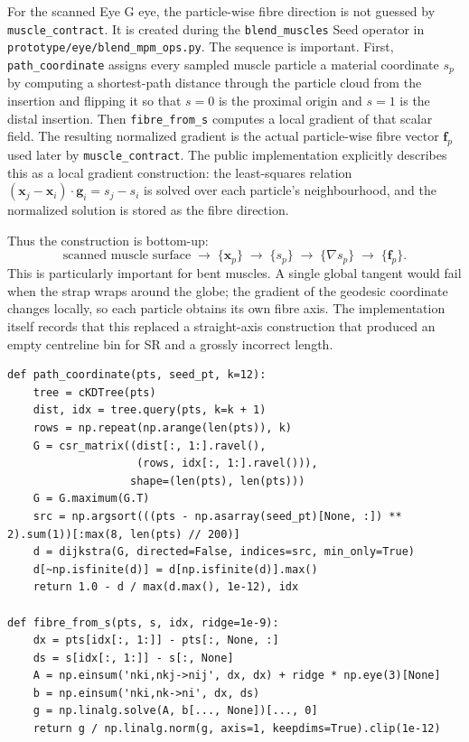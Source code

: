 \documentclass[11pt]{article}
\newcommand{\vect}[1]{\bm{#1}}
\begin{document}
For the scanned Eye G eye, the particle-wise fibre direction is not guessed by
\texttt{muscle\_contract}. It is created during the \texttt{blend\_muscles} Seed
operator in \texttt{prototype/eye/blend\_mpm\_ops.py}. The sequence is important. First,
\texttt{path\_coordinate} assigns every sampled muscle particle a material coordinate
$s_p$ by computing a shortest-path distance through the particle cloud from the
insertion and flipping it so that $s=0$ is the proximal origin and $s=1$ is the distal
insertion. Then \texttt{fibre\_from\_s} computes a local gradient of that scalar field.
The resulting normalized gradient is the actual particle-wise fibre vector $\vect f_p$
used later by \texttt{muscle\_contract}. The public implementation explicitly describes
this as a local gradient construction: the least-squares relation
$(\vect x_j-\vect x_i)\!\cdot\!\vect g_i=s_j-s_i$ is solved over each particle's
neighbourhood, and the normalized solution is stored as the fibre direction.

Thus the construction is bottom-up:
\begin{equation}
\text{scanned muscle surface}
\;\longrightarrow\;
\{\vect x_p\}
\;\longrightarrow\;
\{s_p\}
\;\longrightarrow\;
\{\nabla s_p\}
\;\longrightarrow\;
\{\vect f_p\}.
\label{eq:auto23}
\end{equation}
This is particularly important for bent muscles. A single global tangent would fail
when the strap wraps around the globe; the gradient of the geodesic coordinate changes
locally, so each particle obtains its own fibre axis. The implementation itself records
that this replaced a straight-axis construction that produced an empty centreline bin
for SR and a grossly incorrect length.

\begin{lstlisting}[caption={\texttt{prototype/eye/blend\_mpm\_ops.py}: geodesic material coordinate $s_p$ and the local fibre direction $\vect f_p$. Source lines 2037--2112 on the current \texttt{main} branch.},label={lst:fibre-from-s}]
def path_coordinate(pts, seed_pt, k=12):
    tree = cKDTree(pts)
    dist, idx = tree.query(pts, k=k + 1)
    rows = np.repeat(np.arange(len(pts)), k)
    G = csr_matrix((dist[:, 1:].ravel(),
                    (rows, idx[:, 1:].ravel())),
                   shape=(len(pts), len(pts)))
    G = G.maximum(G.T)
    src = np.argsort(((pts - np.asarray(seed_pt)[None, :]) ** 2).sum(1))[:max(8, len(pts) // 200)]
    d = dijkstra(G, directed=False, indices=src, min_only=True)
    d[~np.isfinite(d)] = d[np.isfinite(d)].max()
    return 1.0 - d / max(d.max(), 1e-12), idx

def fibre_from_s(pts, s, idx, ridge=1e-9):
    dx = pts[idx[:, 1:]] - pts[:, None, :]
    ds = s[idx[:, 1:]] - s[:, None]
    A = np.einsum('nki,nkj->nij', dx, dx) + ridge * np.eye(3)[None]
    b = np.einsum('nki,nk->ni', dx, ds)
    g = np.linalg.solve(A, b[..., None])[..., 0]
    return g / np.linalg.norm(g, axis=1, keepdims=True).clip(1e-12)
\end{lstlisting}
\end{document}

